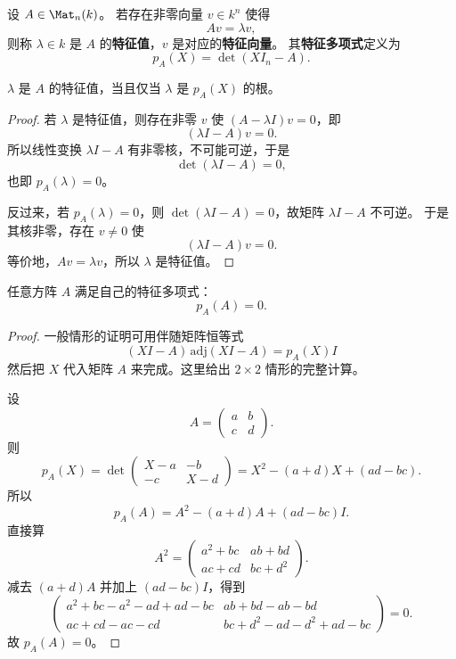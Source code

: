 \begin{definition}[特征值与特征多项式]
设 $A\in \Mat_n(k)$。
若存在非零向量 $v\in k^n$ 使得
\[
  Av=\lambda v,
\]
则称 $\lambda\in k$ 是 $A$ 的\textbf{特征值}，$v$ 是对应的\textbf{特征向量}。
其\textbf{特征多项式}定义为
\begin{equation}
  p_A(X)=\det(XI_n-A).
\end{equation}
\end{definition}

\begin{proposition}
$\lambda$ 是 $A$ 的特征值，当且仅当 $\lambda$ 是 $p_A(X)$ 的根。
\end{proposition}

\begin{proof}
若 $\lambda$ 是特征值，则存在非零 $v$ 使 $(A-\lambda I)v=0$，即
\[
  (\lambda I-A)v=0.
\]
所以线性变换 $\lambda I-A$ 有非零核，不可能可逆，于是
\[
  \det(\lambda I-A)=0,
\]
也即 $p_A(\lambda)=0$。

反过来，若 $p_A(\lambda)=0$，则 $\det(\lambda I-A)=0$，故矩阵 $\lambda I-A$ 不可逆。
于是其核非零，存在 $v\neq 0$ 使
\[
  (\lambda I-A)v=0.
\]
等价地，$Av=\lambda v$，所以 $\lambda$ 是特征值。
\end{proof}

\begin{theorem}
任意方阵 $A$ 满足自己的特征多项式：
\begin{equation}
  p_A(A)=0.
\end{equation}
\end{theorem}

\begin{proof}
一般情形的证明可用伴随矩阵恒等式
\[
  (XI-A)\,\mathrm{adj}(XI-A)=p_A(X)I
\]
然后把 $X$ 代入矩阵 $A$ 来完成。这里给出 $2\times 2$ 情形的完整计算。

设
\[
  A=\begin{pmatrix} a & b \\ c & d \end{pmatrix}.
\]
则
\[
  p_A(X)=\det\begin{pmatrix} X-a & -b \\ -c & X-d \end{pmatrix}
  = X^2-(a+d)X+(ad-bc).
\]
所以
\[
  p_A(A)=A^2-(a+d)A+(ad-bc)I.
\]
直接算
\[
  A^2=\begin{pmatrix}
    a^2+bc & ab+bd \\
    ac+cd & bc+d^2
  \end{pmatrix}.
\]
减去 $(a+d)A$ 并加上 $(ad-bc)I$，得到
\[
  \begin{pmatrix}
    a^2+bc-a^2-ad+ad-bc & ab+bd-ab-bd \\
    ac+cd-ac-cd & bc+d^2-ad-d^2+ad-bc
  \end{pmatrix}
  =0.
\]
故 $p_A(A)=0$。
\end{proof}


